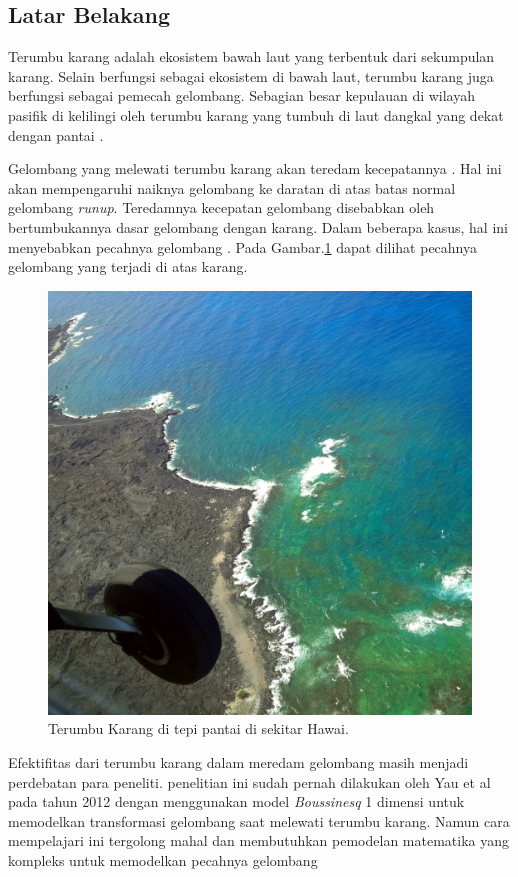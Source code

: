 \subsection{\textbf{Latar Belakang}}

Terumbu karang adalah ekosistem bawah laut yang terbentuk dari sekumpulan karang. Selain berfungsi sebagai ekosistem di bawah laut, terumbu karang juga berfungsi sebagai pemecah gelombang. Sebagian besar kepulauan di wilayah pasifik di kelilingi oleh terumbu karang yang tumbuh di laut dangkal yang dekat dengan pantai \cite{DemirbilekBoussinesq}.

Gelombang yang melewati terumbu karang akan teredam kecepatannya \cite{DemirbilekReport}. Hal ini akan mempengaruhi naiknya gelombang ke daratan di atas batas normal gelombang \emph{runup}\cite{nielsen1991wave}. Teredamnya kecepatan gelombang disebabkan oleh bertumbukannya dasar gelombang dengan karang. Dalam beberapa kasus, hal ini menyebabkan pecahnya gelombang \cite{DemirbilekReport}. Pada Gambar.\ref{fig:hawai_coral} dapat dilihat pecahnya gelombang yang terjadi di atas karang.

\begin{figure}[htp]
    \begin{center}
        \includegraphics[scale=0.1]{./images/hawai_coral.jpg}
    \end{center}
    \caption{Terumbu Karang di tepi pantai di sekitar Hawai.}
    \label{fig:hawai_coral}
\end{figure}
\FloatBarrier
Efektifitas dari terumbu karang dalam meredam gelombang masih menjadi perdebatan para peneliti. penelitian ini sudah pernah dilakukan oleh Yau et al pada tahun 2012 dengan menggunakan model \emph{Boussinesq} 1 dimensi untuk memodelkan transformasi gelombang saat melewati terumbu karang. Namun cara mempelajari ini tergolong mahal dan membutuhkan pemodelan matematika yang kompleks untuk memodelkan pecahnya gelombang\cite{YAO201230}

